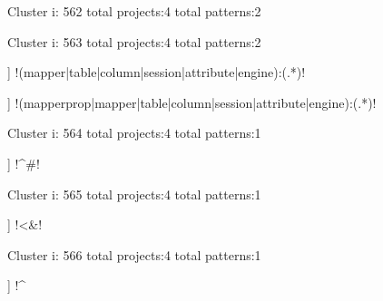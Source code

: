Cluster i: 562
total projects:4
total patterns:2
\begin{multicols}{1}
\end{multicols}







Cluster i: 563
total projects:4
total patterns:2
\begin{multicols}{1}
\begin{description}[noitemsep,topsep=0pt]
\item [[2] ] \cverb!(mapper|table|column|session|attribute|engine):(.*)!
\item [[2] ] \cverb!(mapperprop|mapper|table|column|session|attribute|engine):(.*)!
\end{description}
\end{multicols}







Cluster i: 564
total projects:4
total patterns:1
\begin{multicols}{1}
\begin{description}[noitemsep,topsep=0pt]
\item [[4] ] \cverb!^#!
\end{description}
\end{multicols}







Cluster i: 565
total projects:4
total patterns:1
\begin{multicols}{1}
\begin{description}[noitemsep,topsep=0pt]
\item [[4] ] \cverb!<&!
\end{description}
\end{multicols}







Cluster i: 566
total projects:4
total patterns:1
\begin{multicols}{1}
\begin{description}[noitemsep,topsep=0pt]
\item [[4] ] \cverb!^%
\end{description}
\end{multicols}







